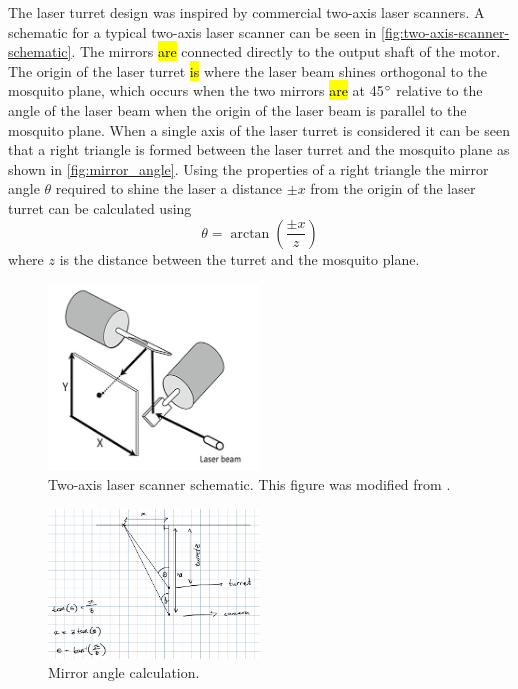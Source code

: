 The laser turret design was inspired by commercial two-axis laser scanners. A schematic for a typical two-axis laser scanner can be seen in \autoref{fig:two-axis-scanner-schematic}. The mirrors \hl{are} connected directly to the output shaft of the motor. The origin of the laser turret \hl{is} where the laser beam shines orthogonal to the mosquito plane, which occurs when the two mirrors \hl{are} at 45$^{\circ}$ relative to the angle of the laser beam when the origin of the laser beam is parallel to the mosquito plane. When a single axis of the laser turret is considered it can be seen that a right triangle is formed between the laser turret and the mosquito plane as shown in \autoref{fig:mirror_angle}. Using the properties of a right triangle the mirror angle $\theta$ required to shine the laser a distance $\pm x$ from the origin of the laser turret can be calculated using
\begin{equation}
    \theta = \arctan{\left(\frac{\pm x}{z}\right)}
    \label{eq:mirror_angle}
\end{equation}
where $z$ is the distance between the turret and the mosquito plane.

\begin{figure}[h]
    \centering
    \includegraphics[width=0.5\textwidth]{figures/hardware_design/two_axis_scanner.png}
    \caption{Two-axis laser scanner schematic. This figure was modified from \cite{two-axis-scanner-schematic}.}
    \label{fig:two-axis-scanner-schematic}
\end{figure}

\begin{figure}[h]
    \centering
    \includegraphics[width=0.5\textwidth]{figures/hardware_design/mirror_angle.png}
    \caption{Mirror angle calculation.}
    \label{fig:mirror_angle}
\end{figure}

